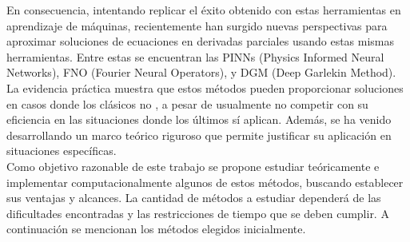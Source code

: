 \documentclass[a4paper,11pt]{scrartcl}
\begin{document}
	En consecuencia, intentando replicar el éxito obtenido con estas herramientas en aprendizaje de máquinas, recientemente han surgido nuevas perspectivas para aproximar soluciones de ecuaciones en derivadas parciales usando estas mismas herramientas. Entre estas se encuentran las PINNs (Physics Informed Neural Networks)\cite{PINNs,PINNS2}, FNO (Fourier Neural Operators)\cite{li_fourier_2021}, y DGM (Deep Garlekin Method)\cite{sirignano_dgm_2018}. La evidencia práctica muestra que estos métodos pueden proporcionar soluciones en casos donde los clásicos no \cite{cuomo_scientific_2022,blechschmidt_three_2021}, a pesar de usualmente no competir con su eficiencia en las situaciones donde los últimos sí aplican. Además, se ha venido desarrollando un marco teórico riguroso que permite justificar su aplicación en situaciones específicas.  \\
	
	Como objetivo razonable de este trabajo se propone estudiar teóricamente e implementar computacionalmente algunos de estos métodos, buscando establecer sus ventajas y alcances. La cantidad de métodos a estudiar dependerá de las dificultades encontradas y las restricciones de tiempo que se deben cumplir. A continuación se mencionan los métodos elegidos inicialmente.\\
	
\end{document}
